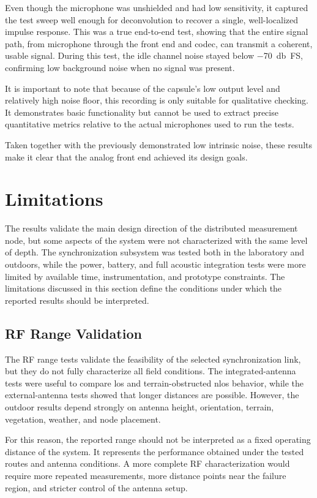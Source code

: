 Even though the microphone was unshielded and had low sensitivity, it captured the test sweep well enough for deconvolution to recover a single, well-localized impulse response. This was a true end-to-end test, showing that the entire signal path, from microphone through the front end and codec, can transmit a coherent, usable signal. During this test, the idle channel noise stayed below \SI{-70}{\decibel FS}, confirming low background noise when no signal was present.

It is important to note that because of the capsule's low output level and relatively high noise floor, this recording is only suitable for qualitative checking. It demonstrates basic functionality but cannot be used to extract precise quantitative metrics relative to the actual microphones used to run the tests. 

Taken together with the previously demonstrated low intrinsic noise, these results make it clear that the analog front end achieved its design goals. 

\section{Limitations}

The results validate the main design direction of the distributed measurement node, but some aspects of the system were not characterized with the same level of depth. The synchronization subsystem was tested both in the laboratory and outdoors, while the power, battery, and full acoustic integration tests were more limited by available time, instrumentation, and prototype constraints. The limitations discussed in this section define the conditions under which the reported results should be interpreted.

\subsection{RF Range Validation}

The RF range tests validate the feasibility of the selected synchronization link, but they do not fully characterize all field conditions. The integrated-antenna tests were useful to compare \acrshort{los} and terrain-obstructed \acrshort{nlos} behavior, while the external-antenna tests showed that longer distances are possible. However, the outdoor results depend strongly on antenna height, orientation, terrain, vegetation, weather, and node placement.

For this reason, the reported range should not be interpreted as a fixed operating distance of the system. It represents the performance obtained under the tested routes and antenna conditions. A more complete RF characterization would require more repeated measurements, more distance points near the failure region, and stricter control of the antenna setup.

